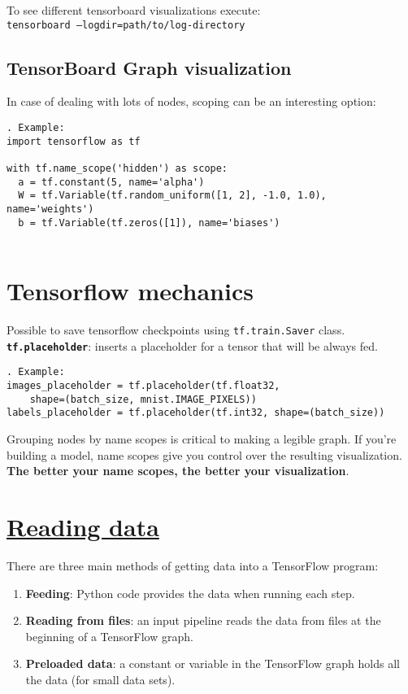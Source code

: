 \documentclass[11pt,a4paper]{article}
\begin{document}
To see different tensorboard  visualizations execute: \\ 
\texttt{tensorboard --logdir=path/to/log-directory}

\subsection{TensorBoard Graph visualization}
In case of dealing with lots of nodes, scoping can be an interesting option: 
\begin{lstlisting}. Example: 
import tensorflow as tf

with tf.name_scope('hidden') as scope:
  a = tf.constant(5, name='alpha')
  W = tf.Variable(tf.random_uniform([1, 2], -1.0, 1.0), name='weights')
  b = tf.Variable(tf.zeros([1]), name='biases')
  
  \end{lstlisting} 
\section{Tensorflow mechanics}
Possible to save tensorflow checkpoints using \texttt{tf.train.Saver} class.\\
\textbf{\texttt{tf.placeholder}}: inserts a placeholder for a tensor that will be always fed. 
\begin{lstlisting}. Example: 
images_placeholder = tf.placeholder(tf.float32, 
	shape=(batch_size, mnist.IMAGE_PIXELS))
labels_placeholder = tf.placeholder(tf.int32, shape=(batch_size))
\end{lstlisting}
Grouping nodes by name scopes is critical to making a legible graph. If you're building a model, name scopes give you control over the resulting visualization. \textbf{The better your name scopes, the better your visualization}.

\section{\href{www.tensorflow.org/versions/r0.11/how_tos/reading_data/index.html}{Reading data}}
There are three main methods of getting data into a TensorFlow program: 
\begin{enumerate}
	\item \textbf{Feeding}: Python code provides the data when running each step. 
	\item \textbf{Reading from files}: an input pipeline reads the data from files at the beginning of a TensorFlow graph. 
	\item \textbf{Preloaded data}: a constant or variable in the TensorFlow graph holds all the data (for small data sets). 
\end{enumerate}
\end{document}
